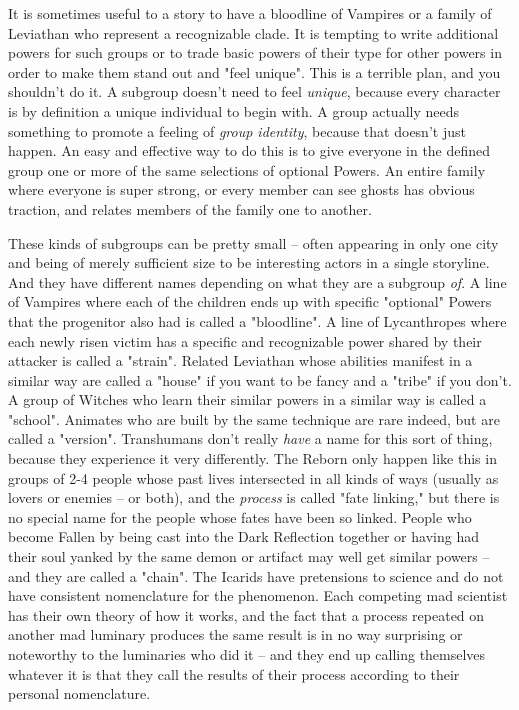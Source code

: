 It is sometimes useful to a story to have a bloodline of Vampires or a family of Leviathan who represent a recognizable clade. It is tempting to write additional powers for such groups or to trade basic powers of their type for other powers in order to make them stand out and "feel unique". This is a terrible plan, and you shouldn't do it. A subgroup doesn't need to feel \textit{unique}, because every character is by definition a unique individual to begin with. A group actually needs something to promote a feeling of \textit{group identity}, because that doesn't just happen. An easy and effective way to do this is to give everyone in the defined group one or more of the same selections of optional Powers. An entire family where everyone is super strong, or every member can see ghosts has obvious traction, and relates members of the family one to another.

These kinds of subgroups can be pretty small -- often appearing in only one city and being of merely sufficient size to be interesting actors in a single storyline. And they have different names depending on what they are a subgroup \textit{of}. A line of Vampires where each of the children ends up with specific "optional" Powers that the progenitor also had is called a "bloodline". A line of Lycanthropes where each newly risen victim has a specific and recognizable power shared by their attacker is called a "strain". Related Leviathan whose abilities manifest in a similar way are called a "house" if you want to be fancy and a "tribe" if you don't. A group of Witches who learn their similar powers in a similar way is called a "school". Animates who are built by the same technique are rare indeed, but are called a "version". Transhumans don't really \textit{have} a name for this sort of thing, because they experience it very differently. The Reborn only happen like this in groups of 2-4 people whose past lives intersected in all kinds of ways (usually as lovers or enemies -- or both), and the \textit{process} is called "fate linking," but there is no special name for the people whose fates have been so linked. People who become Fallen by being cast into the Dark Reflection together or having had their soul yanked by the same demon or artifact may well get similar powers -- and they are called a "chain". The Icarids have pretensions to science and do not have consistent nomenclature for the phenomenon. Each competing mad scientist has their own theory of how it works, and the fact that a process repeated on another mad luminary produces the same result is in no way surprising or noteworthy to the luminaries who did it -- and they end up calling themselves whatever it is that they call the results of their process according to their personal nomenclature.

